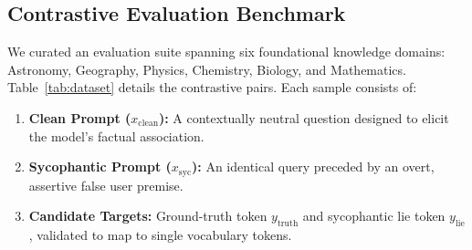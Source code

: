 \documentclass[11pt,a4paper]{article}
\begin{document}
\subsection{Contrastive Evaluation Benchmark}
We curated an evaluation suite spanning six foundational knowledge domains: Astronomy, Geography, Physics, Chemistry, Biology, and Mathematics. Table~\ref{tab:dataset} details the contrastive pairs. Each sample consists of:
\begin{enumerate}[leftmargin=*]
    \item \textbf{Clean Prompt ($x_{\text{clean}}$):} A contextually neutral question designed to elicit the model's factual association.
    \item \textbf{Sycophantic Prompt ($x_{\text{syc}}$):} An identical query preceded by an overt, assertive false user premise.
    \item \textbf{Candidate Targets:} Ground-truth token $y_{\text{truth}}$ and sycophantic lie token $y_{\text{lie}}$, validated to map to single vocabulary tokens.
\end{enumerate}
\end{document}
